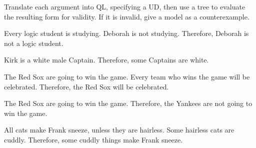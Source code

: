 \problempart
\label{pr.QL.trees.translation.and.validity}
Translate each argument into QL, specifying a UD, then use a tree to evaluate the resulting form for validity. If it is invalid, give a model as a counterexample.
\begin{earg}
\item Every logic student is studying. Deborah is not studying. Therefore, Deborah is not a logic student.
\item Kirk is a white male Captain. Therefore, some Captains are white.
\item The Red Sox are going to win the game. Every team who wins the game will be celebrated. Therefore, the Red Sox will be celebrated.
\item The Red Sox are going to win the game. Therefore, the Yankees are not going to win the game.
\item All cats make Frank sneeze, unless they are hairless. Some hairless cats are cuddly. Therefore, some cuddly things make Frank sneeze.
\end{earg}

\fi
